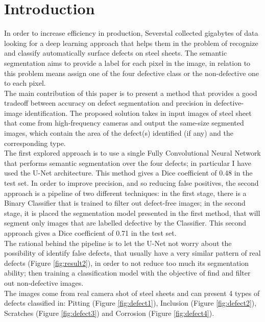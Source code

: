 \documentclass[10pt,twocolumn,letterpaper]{article}
\begin{document}
\section{Introduction}
   In order to increase efficiency in production, Severstal collected gigabytes of data looking for a deep learning approach that helps them in the problem of recognize and classify automatically surface defects on steel sheets. The semantic segmentation aims to provide a label for each pixel in the image, in relation to this problem means assign one of the four defective class or the non-defective one to each pixel.\\
   The main contribution of this paper is to present a method that provides a good tradeoff between accuracy on defect segmentation and precision in defective-image identification. The proposed solution takes in input images of steel sheet that come from high-frequency cameras and output the same-size segmented images, which contain the area of the defect(s) identified (if any) and the corresponding type. \\
   The first explored approach is to use a single Fully Convolutional Neural Network that performs semantic segmentation over the four defects; in particular I have used the U-Net architecture. This method gives a Dice coefficient of 0.48 in the test set.
   In order to improve precision, and so reducing false positives, the second approach is a pipeline of two different techniques: in the first stage, there is a Binary Classifier that is trained to filter out defect-free images; in the second stage, it is placed the segmentation model presented in the first method, that will segment only images that are labelled defective by the Classifier. This second approach gives a Dice coefficient of 0.71 in the test set.\\ 
   The rational behind the pipeline is to let the U-Net not worry about the possibility of identify false defects, that usually have a very similar pattern of real defects (Figure \ref{fig:result2}), in order to not reduce too much its segmentation ability; then training a classification model with the objective of find and filter out non-defective images.\\
   The images come from real camera shot of steel sheets and can present 4 types of defects classified in: Pitting (Figure \ref{fig:defect1}), Inclusion (Figure \ref{fig:defect2}), Scratches (Figure \ref{fig:defect3}) and Corrosion (Figure \ref{fig:defect4}).
   
\end{document}
